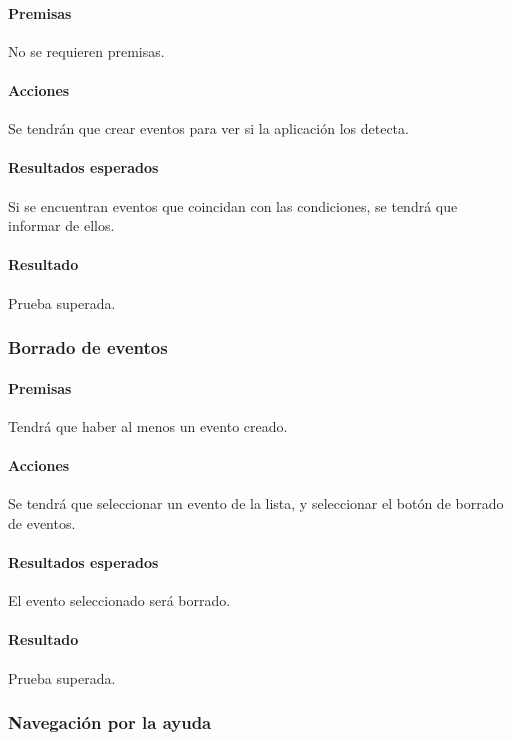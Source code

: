 \paragraph{Premisas}
No se requieren premisas.

\paragraph{Acciones}
Se tendrán que crear eventos para ver si la aplicación los detecta.

\paragraph{Resultados esperados}
Si se encuentran eventos que coincidan con las condiciones, se tendrá que informar de ellos.

\paragraph{Resultado}
Prueba superada.

\subsubsection{Borrado de eventos}

\paragraph{Premisas}
Tendrá que haber al menos un evento creado.

\paragraph{Acciones}
Se tendrá que seleccionar un evento de la lista, y seleccionar el botón de borrado de eventos.

\paragraph{Resultados esperados}
El evento seleccionado será borrado.

\paragraph{Resultado}
Prueba superada.

\subsubsection{Navegación por la ayuda}

